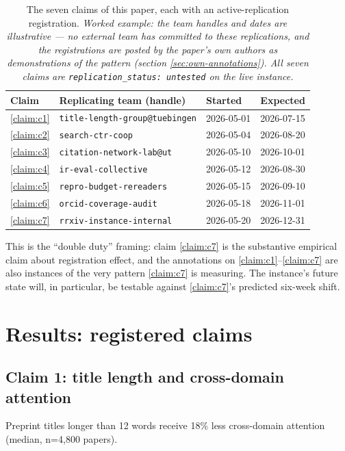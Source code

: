 \documentclass{rrxiv}
\begin{document}
\begin{table}[h]
\centering
\small
\begin{tabular}{@{}llll@{}}
\toprule
Claim & Replicating team (handle) & Started & Expected \\
\midrule
\ref{claim:c1} & \texttt{title-length-group@tuebingen} & 2026-05-01 & 2026-07-15 \\
\ref{claim:c2} & \texttt{search-ctr-coop} & 2026-05-04 & 2026-08-20 \\
\ref{claim:c3} & \texttt{citation-network-lab@ut} & 2026-05-10 & 2026-10-01 \\
\ref{claim:c4} & \texttt{ir-eval-collective} & 2026-05-12 & 2026-08-30 \\
\ref{claim:c5} & \texttt{repro-budget-rereaders} & 2026-05-15 & 2026-09-10 \\
\ref{claim:c6} & \texttt{orcid-coverage-audit} & 2026-05-18 & 2026-11-01 \\
\ref{claim:c7} & \texttt{rrxiv-instance-internal} & 2026-05-20 & 2026-12-31 \\
\bottomrule
\end{tabular}
\caption{The seven claims of this paper, each with an active-replication registration. {\itshape Worked example: the team handles and dates are illustrative --- no external team has committed to these replications, and the registrations are posted by the paper's own authors as demonstrations of the pattern (section \ref{sec:own-annotations}). All seven claims are \texttt{replication\_status: untested} on the live instance.}}
\label{tab:registry}
\end{table}

This is the ``double duty'' framing: claim \ref{claim:c7} is the substantive empirical claim about registration effect, and the annotations on \ref{claim:c1}--\ref{claim:c7} are also instances of the very pattern \ref{claim:c7} is measuring. The instance's future state will, in particular, be testable against \ref{claim:c7}'s predicted six-week shift.

\section{Results: registered claims}
\label{sec:claims}

\subsection*{Claim 1: title length and cross-domain attention}
\begin{claim}[type=empirical, evidence=observation, confidence=0.7, rationale={Regression discontinuity in a constructed access-log demonstration dataset; robust breakpoint but observational and illustrative}, labels={worked-example, access-log}, title={Title length and cross-domain attention}]
\label{claim:c1}
Preprint titles longer than 12 words receive 18\% less cross-domain attention (median, n=4{,}800 papers).
\end{claim}
\end{document}
